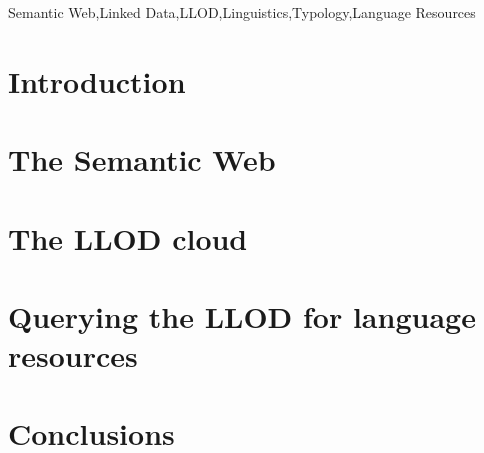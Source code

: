 \documentclass{iosart2c}
\begin{document}
\begin{frontmatter}
\begin{abstract}

\end{abstract}

\begin{keyword}
Semantic Web\sep Linked Data\sep LLOD\sep Linguistics\sep Typology\sep Language Resources
\end{keyword}
\end{frontmatter}

\section{Introduction}


\section{The Semantic Web}
 

\section{The LLOD cloud}


\section{Querying the LLOD for language resources}


\section{Conclusions}






\end{document}
